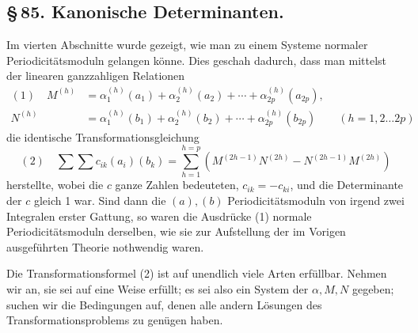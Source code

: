 \documentclass[10pt]{article}
\begin{document}
\subsection*{\S\,85. Kanonische Determinanten.}

Im vierten Abschnitte wurde gezeigt, wie man zu einem Systeme normaler Periodicitätsmoduln gelangen könne. Dies geschah dadurch, dass man mittelst der linearen ganzzahligen Relationen
\[
\begin{aligned}
(1)\quad
M^{(h)}&=\alpha_1^{(h)}(a_1)+\alpha_2^{(h)}(a_2)+\cdots+\alpha_{2p}^{(h)}(a_{2p}),\\
N^{(h)}&=\alpha_1^{(h)}(b_1)+\alpha_2^{(h)}(b_2)+\cdots+\alpha_{2p}^{(h)}(b_{2p})
\qquad (h=1,2\ldots2p)
\end{aligned}
\]
die identische Transformationsgleichung
\[
(2)\quad
\sum\sum c_{ik}(a_i)(b_k)
=\sum_{h=1}^{h=p}\left(M^{(2h-1)}N^{(2h)}-N^{(2h-1)}M^{(2h)}\right)
\]
herstellte, wobei die \(c\) ganze Zahlen bedeuteten, \(c_{ik}=-c_{ki}\), und die Determinante der \(c\) gleich 1 war. Sind dann die \((a),(b)\) Periodicitätsmoduln von irgend zwei Integralen erster Gattung, so waren die Ausdrücke (1) normale Periodicitätsmoduln derselben, wie sie zur Aufstellung der im Vorigen ausgeführten Theorie nothwendig waren.

Die Transformationsformel (2) ist auf unendlich viele Arten erfüllbar. Nehmen wir an, sie sei auf eine Weise erfüllt; es sei also ein System der \(\alpha,M,N\) gegeben; suchen wir die Bedingungen auf, denen alle andern Lösungen des Transformationsproblems zu genügen haben.
\end{document}
